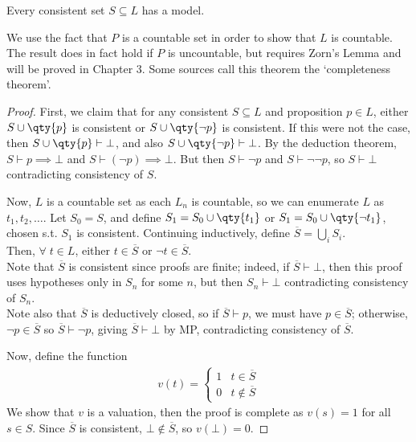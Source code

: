 \begin{theorem} \label{thm:mod}
    Every consistent set $S \subseteq L$ has a model.
\end{theorem}

\begin{remark}
    We use the fact that $P$ is a countable set in order to show that $L$ is countable.
    The result does in fact hold if $P$ is uncountable, but requires Zorn's Lemma and will be proved in Chapter 3.
    Some sources call this theorem the `completeness theorem'.
\end{remark}

\begin{proof}
    First, we claim that for any consistent $S \subseteq L$ and proposition $p \in L$, either $S \cup \qty{p}$ is consistent or $S \cup \qty{\neg p}$ is consistent.
    If this were not the case, then $S \cup \qty{p} \vdash \bot$, and also $S \cup \qty{\neg p} \vdash \bot$.
    By the deduction theorem, $S \vdash p \implies \bot$ and $S \vdash (\neg p) \implies \bot$.
    But then $S \vdash \neg p$ and $S \vdash \neg\neg p$, so $S \vdash \bot$ contradicting consistency of $S$.

    Now, $L$ is a countable set as each $L_n$ is countable, so we can enumerate $L$ as $t_1, t_2, \dots$.
    Let $S_0 = S$, and define $S_1 = S_0 \cup \qty{t_1}$ or $S_1 = S_0 \cup \qty{\neg t_1}$, chosen s.t. $S_1$ is consistent.
    Continuing inductively, define $\overline S = \bigcup_{i} S_i$. \\
    Then, $\forall \; t \in L$, either $t \in \overline S$ or $\neg t \in \overline S$. \\
    Note that $\overline S$ is consistent since proofs are finite; indeed, if $\overline S \vdash \bot$, then this proof uses hypotheses only in $S_n$ for some $n$, but then $S_n \vdash \bot$ contradicting consistency of $S_n$. \\
    Note also that $\overline S$ is deductively closed, so if $\overline S \vdash p$, we must have $p \in \overline S$; otherwise, $\neg p \in \overline S$ so $\overline S \vdash \neg p$, giving $\overline S \vdash \bot$ by MP, contradicting consistency of $\overline S$.

    Now, define the function
    \begin{align*}
    v(t) = \begin{cases}
            1 & t \in \overline S \\
            0 & t \not\in \overline S
        \end{cases}
    \end{align*}
    We show that $v$ is a valuation, then the proof is complete as $v(s) = 1$ for all $s \in S$.
    Since $\overline S$ is consistent, $\bot \not\in \overline S$, so $v(\bot) = 0$.


\end{proof}
